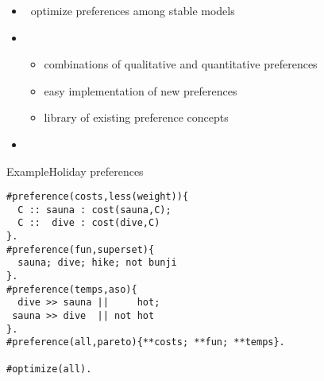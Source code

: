 \newcommand{\pf}[0]{\ensuremath{\mathit{preference}}} %
\newcommand{\name}[0]{\ensuremath{\mathit{name}}} %
\begin{frame}{\asprin}
  \begin{itemize}
  \item {} \ optimize preferences among stable models
  \item {} \
    \begin{itemize}
    \item combinations of qualitative and quantitative preferences
    \item easy implementation of new preferences
    \item library of existing preference concepts
  \end{itemize}
\item {} \ \cite{brderosc15a,alrosc18a,brderosc22a}
  \end{itemize}
\end{frame}
\begin{frame}[fragile]{Example}{Holiday preferences}
\begin{lstlisting}[language=clingo,basicstyle=\small\ttfamily]
#preference(costs,less(weight)){
  C :: sauna : cost(sauna,C);
  C ::  dive : cost(dive,C)
}.
#preference(fun,superset){
  sauna; dive; hike; not bunji
}.
#preference(temps,aso){
  dive >> sauna ||     hot;
 sauna >> dive  || not hot
}.
#preference(all,pareto){**costs; **fun; **temps}.

#optimize(all).
\end{lstlisting}
\end{frame}
